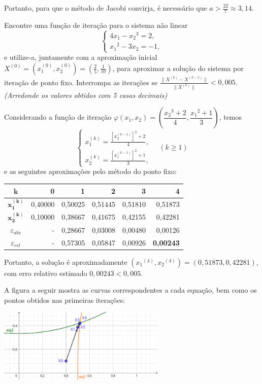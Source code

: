 \documentclass[12pt,a4paper]{article}
\begin{document}
\begin{ExerciseList}
Portanto, para que o método de Jacobi convirja, é necessário que \(\boxed{a > \frac{22}{7} \approx 3,14}\).


\Exercise[title={2,5}] Encontre uma função de iteração para o sistema não linear
\[
\begin{cases}
    4x_1 - {x_2}^3 = 2, \\
    {x_1}^2 - 3x_2 = -1,
\end{cases}
\]
e utilize-a, juntamente com a aproximação inicial \(X^{(0)} = (x_1^{(0)}, x_2^{(0)}) = \left(\frac{2}{5}, \frac{1}{10}\right)\), para aproximar a solução do sistema por iteração de ponto fixo. Interrompa as iterações se \(\frac{\|X^{(k)} - X^{(k-1)}\|}{\|X^{(k)}\|} < 0,005\).
{\color{blue} \textit{(Arredonde os valores obtidos com 5 casas decimais)}}

\Answer Considerando a função de iteração $\varphi(x_1, x_2) = \left(\dfrac{{x_2}^3+2}{4}, \dfrac{{x_1}^2+1}{3}\right)$, temos
\[
\begin{cases}
x_1^{(k)} = \frac{\left[x_2^{(k-1)}\right]^3+2}{4}, \\
x_2^{(k)} = \frac{\left[x_1^{(k-1)}\right]^2+1}{3},
\end{cases}
\quad (k \geq 1)
\]
e as seguintes aproximações pelo método do ponto fixo:
\medskip
\begin{center}
\begin{tabular}{crrrrr}
\hline
$\boldsymbol{k}$     & 0 & 1 & 2 & 3 & 4\\
\hline
$\boldsymbol{x_1^{(k)}}$ & 0,40000 & 0,50025 & 0,51445 & 0,51810 & 0,51873 \\
$\boldsymbol{x_2^{(k)}}$ & 0,10000 & 0,38667 & 0,41675 & 0,42155 & 0,42281 \\
\hline
$\varepsilon_{abs}$ & - & 0,28667 & 0,03008 & 0,00480 & 0,00126 \\
$\varepsilon_{rel}$ & - & 0,57305 & 0,05847 & 0,00926 & \textbf{0,00243} \\
\hline
\end{tabular}
\end{center}
\medskip

Portanto, a solução é aproximadamente $\boxed{({x_1}^{(4)}, {x_2}^{(4)}) = (0,51873, 0,42281)}$, com erro relativo estimado $0,00243 < 0,005$.

A figura a seguir mostra as curvas correspondentes a cada equação, bem como os pontos obtidos nas primeiras iterações:

\begin{center}
  \includegraphics[width=0.6\textwidth]{img/sistema-não-linear-2x2-iteração-ponto-fixo-sequência.pdf}
\end{center}



\end{ExerciseList}
\end{document}
